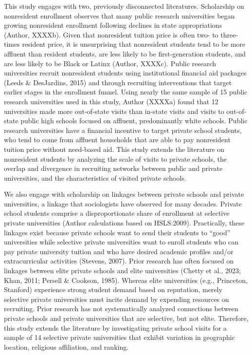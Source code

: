 \documentclass[
  12pt,
]{article}
\begin{document}
This study engages with two, previously disconnected literatures. Scholarship on nonresident enrollment observes that many public research universities began growing nonresident enrollment following declines in state appropriations (Author, XXXXb). Given that nonresident tuition price is often two- to three-times resident price, it is unsurprising that nonresident students tend to be more affluent than resident students, are less likely to be first-generation students, and are less likely to be Black or Latinx (Author, XXXXc). Public research universities recruit nonresident students using institutional financial aid packages (Leeds \& DesJardins, 2015) and through recruiting interventions that target earlier stages in the enrollment funnel. Using nearly the same sample of 15 public research universities used in this study, Author (XXXXa) found that 12 universities made more out-of-state visits than in-state visits and visits to out-of-state public high schools focused on affluent, predominantly white schools. Public research universities have a financial incentive to target private school students, who tend to come from affluent households that are able to pay nonresident tuition price without need-based aid. This study extends the literature on nonresident students by analyzing the scale of visits to private schools, the overlap and divergence in recruiting networks between public and private universities, and the characteristics of visited private schools.

We also engage with scholarship on linkages between private schools and private universities, a linkage that sociologists have observed for many decades. Private school students comprise a disproportionate share of enrollment at selective private universities (Author calculations based on HSLS:2009). Practically, these linkages exist because private schools want to send their students to ``good'' universities while selective private universities want to enroll students who can pay private university tuition and who have desired academic profiles and/or extracurricular activities (Stevens, 2007). Prior research has often focused on linkages between elite private schools and elite universities (Chetty et al., 2023; Khan, 2011; Persell \& Cookson, 1985). Whereas elite universities (e.g., Princeton, Stanford) experience strong student demand based on reputation, merely selective private universities must incite demand by expending resources on recruiting. Prior research has not systematically analyzed connections between private schools and private universities that are selective, but not elite. Therefore, this study extends the literature by investigating private school visits for a sample of 14 selective private universities that exhibit variation in geographic location, religious affiliation, and ranking.
\end{document}
